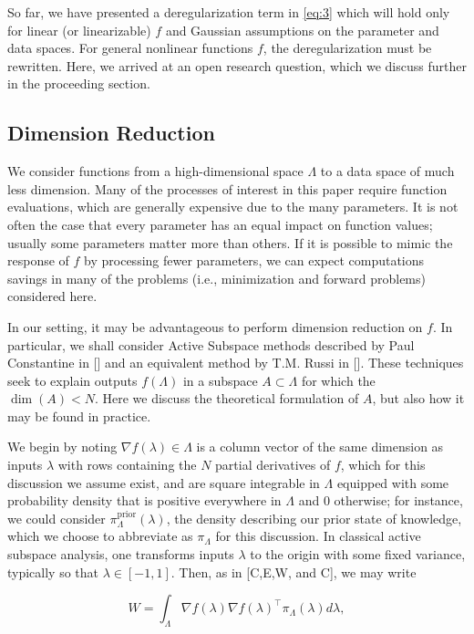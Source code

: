 \documentclass{amsart}
\begin{document}
So far, we have presented a deregularization term in \eqref{eq:3} which will hold only for linear (or linearizable) $f$ and Gaussian assumptions on the parameter and data spaces. For general nonlinear functions $f$, the deregularization must be rewritten. Here, we arrived at an open research question, which we discuss further in the proceeding section.



\subsection{Dimension Reduction}
We consider functions from a high-dimensional space $\Lambda$ to a data space of much less dimension. Many of the processes of interest in this paper require function evaluations, which are generally expensive due to the many parameters. It is not often the case that every parameter has an equal impact on function values; usually some parameters matter more than others. If it is possible to mimic the response of $f$ by processing fewer parameters, we can expect computations savings in many of the problems (i.e., minimization and forward problems) considered here.


In our setting, it may be advantageous to perform dimension reduction on $f$. In particular, we shall consider Active Subspace methods described by Paul Constantine in [] and an equivalent method by T.M. Russi in []. These techniques seek to explain outputs $f(\Lambda)$ in a subspace $A \subset \Lambda$ for which the $\dim (A) <N$. Here we discuss the theoretical formulation of $A$, but also how it may be found in practice.

We begin by noting $\nabla f(\lambda)\in \Lambda$ is a column vector of the same dimension as inputs $\lambda$ with rows containing the $N$ partial derivatives of $f$, which for this discussion we assume exist, and are square integrable in $\Lambda$ equipped with some probability density that is positive everywhere in $\Lambda$ and 0 otherwise; for instance, we could consider $\pi_\Lambda^\text{prior}(\lambda)$, the density describing our prior state of knowledge, which we choose to abbreviate as $\pi_\Lambda$ for this discussion. In classical active subspace analysis, one transforms inputs $\lambda$ to the origin with some fixed variance, typically so that $\lambda\in [-1,1]$. Then, as in [C,E,W, and C], we may write

\begin{equation} \label{eq:5}
W=\int_\Lambda \nabla f(\lambda) \nabla f(\lambda)^\top  \pi_\Lambda(\lambda) d\lambda,
\end{equation} 
\end{document}
